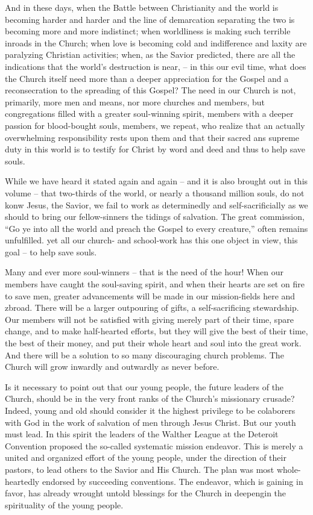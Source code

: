 \documentclass[
]{book}
\begin{document}
And in these days, when the Battle between Christianity and the world is becoming harder and harder and the line of demarcation separating the two is becoming more and more indistinct; when worldliness is making such terrible inroads in the Church; when love is becoming cold and indifference and laxity are paralyzing Christian activities; when, as the Savior predicted, there are all the indications that the world's destruction is near, -- in this our evil time, what does the Church itself need more than a deeper appreciation for the Gospel and a reconsecration to the spreading of this Gospel? The need in our Church is not, primarily, more men and means, nor more churches and members, but congregations filled with a greater soul-winning spirit, members with a deeper passion for blood-bought souls, members, we repeat, who realize that an actually overwhelming responsibility rests upon them and that their sacred ans supreme duty in this world is to testify for Christ by word and deed and thus to help save souls.

While we have heard it stated again and again -- and it is also brought out in this volume -- that two-thirds of the world, or nearly a thousand million souls, do not konw Jesus, the Savior, we fail to work as determinedly and self-sacrificially as we should to bring our fellow-sinners the tidings of salvation. The great commission, ``Go ye into all the world and preach the Gospel to every creature,'' often remains unfulfilled. yet all our church- and school-work has this one object in view, this goal -- to help save souls.

Many and ever more soul-winners -- that is the need of the hour! When our members have caught the soul-saving spirit, and when their hearts are set on fire to save men, greater advancements will be made in our mission-fields here and zbroad. There will be a larger outpouring of gifts, a self-sacrificing stewardship. Our members will not be satisfied with giving merely part of their time, spare change, and to make half-hearted efforts, but they will give the best of their time, the best of their money, and put their whole heart and soul into the great work. And there will be a solution to so many discouraging church problems. The Church will grow inwardly and outwardly as never before.

Is it necessary to point out that our young people, the future leaders of the Church, should be in the very front ranks of the Church's missionary crusade? Indeed, young and old should consider it the highest privilege to be colaborers with God in the work of salvation of men through Jesus Christ. But our youth must lead. In this spirit the leaders of the Walther League at the Deteroit Convention proposed the so-called systematic mission endeavor. This is merely a united and organized effort of the young people, under the direction of their pastors, to lead others to the Savior and His Church. The plan was most whole-heartedly endorsed by succeeding conventions. The endeavor, which is gaining in favor, has already wrought untold blessings for the Church in deepengin the spirituality of the young people.
\end{document}
